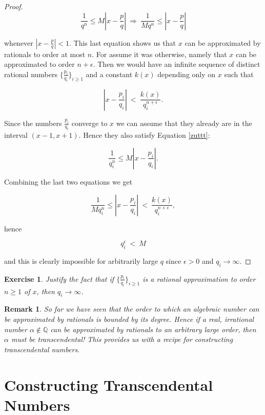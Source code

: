 \documentclass[12pt,letterpaper]{report}
\newcommand\be{\begin{equation}}
\newcommand\ee{\end{equation}}
\newcommand{\Q}{\mathbb{Q}}
\newtheorem{exe}[thm]{Exercise}
\newtheorem{rek}[thm]{Remark}
\begin{document}
\begin{proof}
\be \label{zuttt} \frac{1}{q^n}\leq M\left|x-\frac{p}{q}\right| \
\Rightarrow \ \frac{1}{Mq^n}\leq \left|x-\frac{p}{q}\right| \ee

whenever $|x-\frac{p}{q}|<1$. This last equation shows us that $x$
can be approximated by rationals to order at most $n$. For assume
it was otherwise, namely that $x$ can be approximated to order
$n+\epsilon$. Then we would have an infinite sequence of distinct
rational numbers $\{\frac{p_i}{q_i}\}_{i\geq 1}$ and a constant
$k(x)$ depending only on $x$ such that

\be \left|x-\frac{p_i}{q_i}\right| \ < \
\frac{k(x)}{q_i^{n+\epsilon}}. \ee

Since the numbers $\frac{p_i}{q_i}$ converge to $x$ we can assume
that they already are in the interval $(x-1,x+1)$. Hence they also
satisfy Equation \ref{zuttt}:

\be \frac{1}{q_i^n}\leq M \left|x-\frac{p_i}{q_i}\right|. \ee

Combining the last two equations we get

\be \frac{1}{Mq_i^n}\leq \left|x-\frac{p_i}{q_i}\right| \ < \
\frac{k(x)}{q_i^{n+\epsilon}}, \ee

hence

\be q_i^{\epsilon} \ < \ M \ee

and this is clearly impossible for arbitrarily large $q$ since
$\epsilon > 0$ and $q_i\rightarrow \infty$.

\end{proof}

\begin{exe}
Justify the fact that if  $\{\frac{p_i}{q_i}\}_{i\geq 1}$ is a
rational approximation to order $n\geq 1$ of $x$, then
$q_i\rightarrow \infty$.
\end{exe}

\begin{rek}
\label{zzut} So far we have seen that the order to which an
algebraic number can be approximated by rationals is bounded by
its degree. Hence if a real, irrational number $\alpha \notin \Q$
can be approximated by rationals to an arbitrary large order, then
$\alpha$ must be transcendental! This provides us with a recipe
for constructing transcendental numbers.
\end{rek}



\section{Constructing Transcendental Numbers}
\end{document}
